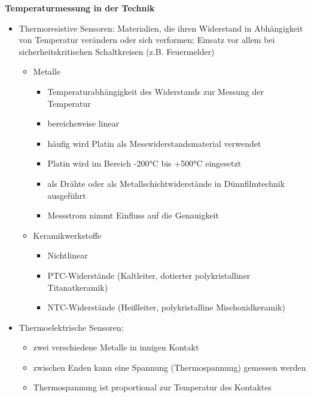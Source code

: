 \noindent
\textbf{Temperaturmessung in der Technik}
\begin{itemize}
\item Thermoresistive Sensoren: Materialien, die ihren Widerstand in Abhängigkeit von Temperatur verändern oder sich verformen; Einsatz vor allem bei sicherheitskritischen Schaltkreisen (z.B. Feuermelder)
\begin{itemize}
\item Metalle
\begin{itemize}
\item Temperaturabhängigkeit des Widerstands zur Messung der Temperatur
\item bereichsweise linear
\item häufig wird Platin als Messwiderstandsmaterial verwendet
\item Platin wird im Bereich -200°C bis +500°C eingesetzt
\item als Drähte oder als Metallschichtwiderstände in Dünnfilmtechnik ausgeführt
\item Messstrom nimmt Einfluss auf die Genauigkeit
\end{itemize}
\item Keramikwerkstoffe
\begin{itemize}
\item Nichtlinear
\item PTC-Widerstände (Kaltleiter, dotierter polykristalliner Titanatkeramik)
\item NTC-Widerstände (Heißleiter, polykristalline Mischoxidkeramik)
\end{itemize}
\end{itemize}
\item Thermoelektrische Sensoren:
\begin{itemize}
\item zwei verschiedene Metalle in innigen Kontakt
\item zwischen Enden kann eine Spannung (Thermospannung) gemessen werden
\item Thermospannung ist proportional zur Temperatur des Kontaktes
\end{itemize}
\end{itemize}
